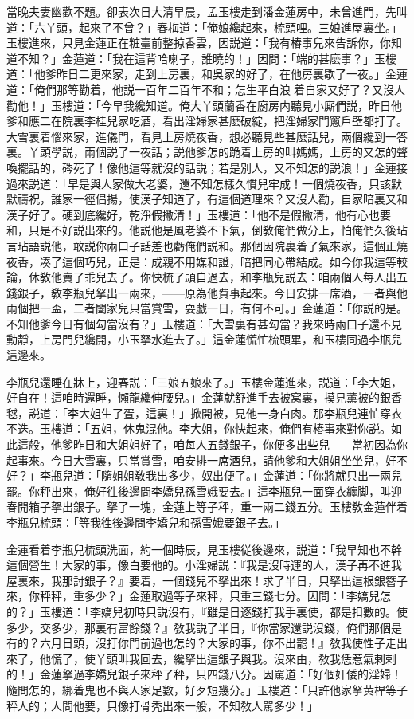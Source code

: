 當晚夫妻幽歡不題。卻表次日大清早晨，孟玉樓走到潘金蓮房中，未曾進門，先叫道：「六丫頭，起來了不曾？」春梅道：「俺娘纔起來，梳頭哩。三娘進屋裏坐。」玉樓進來，只見金蓮正在粧臺前整掠香雲，因説道：「我有樁事兒來告訴你，你知道不知？」金蓮道：「我在這背哈喇子，誰曉的！」因問：「端的甚麽事？」玉樓道：「他爹昨日二更來家，走到上房裏，和吳家的好了，在他房裏歇了一夜。」金蓮道：「俺們那等勸着，他説一百年二百年不和；怎生平白浪𢵞着自家又好了？又沒人勸他！」玉樓道：「今早我纔知道。俺大丫頭蘭香在廚房内聽見小廝們説，昨日他爹和應二在院裏李桂兒家吃酒，看出淫婦家甚麽破綻，把淫婦家門窻戶壁都打了。大雪裏着惱來家，進儀門，看見上房燒夜香，想必聽見些甚麽話兒，兩個纔到一答裏。丫頭學説，兩個説了一夜話；説他爹怎的跪着上房的叫媽媽，上房的又怎的聲喚擺話的，硶死了！像他這等就沒的話説；若是別人，又不知怎的説浪！」金蓮接過來説道：「早是與人家做大老婆，還不知怎樣久慣兒牢成！一個燒夜香，只該默默禱祝，誰家一徑倡揚，使漢子知道了，有這個道理來？又沒人勸，自家暗裏又和漢子好了。硬到底纔好，乾淨假撇清！」玉樓道：「他不是假撇清，他有心也要和，只是不好説出來的。他説他是風老婆不下氣，倒敎俺們做分上，怕俺們久後玷言玷語説他，敢説你兩口子話差也虧俺們説和。那個因院裏着了氣來家，這個正燒夜香，凑了這個巧兒，正是：成親不用媒和證，暗把同心帶結成。如今你我這等較論，休敎他賣了乖兒去了。你快梳了頭自過去，和李瓶兒説去：咱兩個人每人出五錢銀子，敎李瓶兒拏出一兩來，——原為他費事起來。今日安排一席酒，一者與他兩個把一盃，二者闔家兒只當賞雪，耍戯一日，有何不可。」金蓮道：「你説的是。不知他爹今日有個勾當沒有？」玉樓道：「大雪裏有甚勾當？我來時兩口子還不見動靜，上房門兒纔開，小玉拏水進去了。」這金蓮慌忙梳頭畢，和玉樓同過李瓶兒這邊來。

李瓶兒還睡在牀上，迎春説：「三娘五娘來了。」玉樓金蓮進來，説道：「李大姐，好自在！這咱時還睡，懶龍纔伸腰兒。」金蓮就舒進手去被窝裏，摸見薰被的銀香毬，説道：「李大姐生了疍，這裏！」掀開被，見他一身白肉。那李瓶兒連忙穿衣不迭。玉樓道：「五姐，休鬼混他。李大姐，你快起來，俺們有樁事來對你説。如此這般，他爹昨日和大姐姐好了，咱每人五錢銀子，你便多出些兒——當初因為你起事來。今日大雪裏，只當賞雪，咱安排一席酒兒，請他爹和大姐姐坐坐兒，好不好？」李瓶兒道：「隨姐姐敎我出多少，奴出便了。」金蓮道：「你將就只出一兩兒罷。你秤出來，俺好徃後邊問李嬌兒孫雪娥要去。」這李瓶兒一面穿衣纏脚，叫迎春開箱子拏出銀子。拏了一塊，金蓮上等子秤，重一兩二錢五分。玉樓敎金蓮伴着李瓶兒梳頭：「等我徃後邊問李嬌兒和孫雪娥要銀子去。」

金蓮看着李瓶兒梳頭洗面，約一個時辰，見玉樓従後邊來，説道：「我早知也不幹這個營生！大家的事，像白要他的。小淫婦説：『我是沒時運的人，漢子再不進我屋裏來，我那討銀子？』要着，一個錢兒不拏出來！求了半日，只拏出這根銀簪子來，你秤秤，重多少？」金蓮取過等子來秤，只重三錢七分。因問：「李嬌兒怎的？」玉樓道：「李嬌兒初時只説沒有，『雖是日逐錢打我手裏使，都是扣數的。使多少，交多少，那裏有富餘錢？』敎我説了半日，『你當家還説沒錢，俺們那個是有的？六月日頭，沒打你門前過也怎的？大家的事，你不出罷！』敎我使性子走出來了，他慌了，使丫頭叫我回去，纔拏出這銀子與我。沒來由，敎我恁惹氣剌剌的！」金蓮拏過李嬌兒銀子來秤了秤，只四錢八分。因駡道：「好個奸倭的淫婦！隨問怎的，綁着鬼也不與人家足數，好歹短幾分。」玉樓道：「只許他家拏黄桿等子秤人的；人問他要，只像打骨秃出來一般，不知敎人駡多少！」

